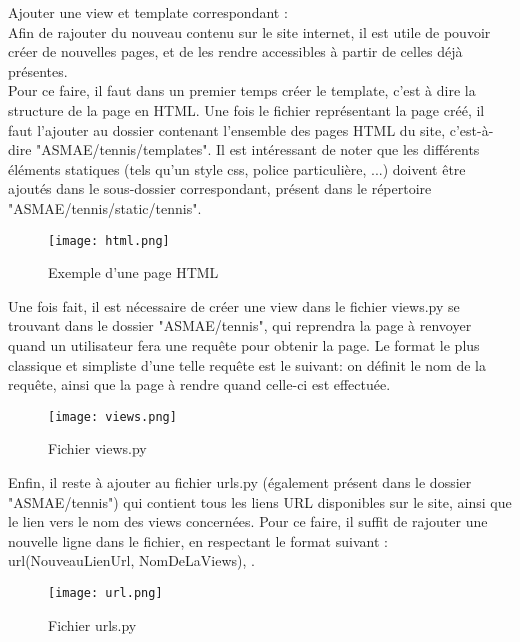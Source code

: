 Ajouter une view et template correspondant :\\

Afin de rajouter du nouveau contenu sur le site internet, il est utile de pouvoir créer de nouvelles pages, et de les rendre accessibles à partir de celles déjà présentes.\\

Pour ce faire, il faut dans un premier temps créer le template, c'est à dire la structure de la page en HTML. Une fois le fichier représentant la page créé, il faut l'ajouter au dossier contenant l'ensemble des pages HTML du site, c'est-à-dire "ASMAE/tennis/templates". Il est intéressant de noter que les différents éléments statiques (tels qu'un style css, police particulière, ...) doivent être ajoutés dans le sous-dossier correspondant, présent dans le répertoire "ASMAE/tennis/static/tennis".\\

\begin{figure}[H]
\centering
\texttt{[image: html.png]}
\caption{Exemple d'une page HTML}
\end{figure}

Une fois fait, il est nécessaire de créer une view dans le fichier views.py se trouvant dans le dossier "ASMAE/tennis", qui reprendra la page à renvoyer quand un utilisateur fera une requête pour obtenir la page. Le format le plus classique et simpliste d'une telle requête est le suivant: on définit le nom de la requête, ainsi que la page à rendre quand celle-ci est effectuée.\\

\begin{figure}[H]
\centering
\texttt{[image: views.png]}
\caption{Fichier views.py}
\end{figure}

Enfin, il reste à ajouter au fichier urls.py (également présent dans le dossier "ASMAE/tennis") qui contient tous les liens URL disponibles sur le site, ainsi que le lien vers le nom des views concernées. Pour ce faire, il suffit de rajouter une nouvelle ligne dans le fichier, en respectant le format suivant : url(NouveauLienUrl, NomDeLaViews), .

\begin{figure}[H]
\centering
\texttt{[image: url.png]}
\caption{Fichier urls.py}
\end{figure}
